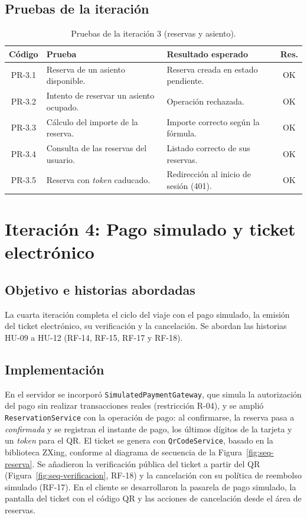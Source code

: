 \subsection{Pruebas de la iteración}

\begin{table}[h!]
\centering
\small
\begin{tabular}{|c|p{6.5cm}|p{5cm}|c|}
\hline
\textbf{Código} & \textbf{Prueba} & \textbf{Resultado esperado} & \textbf{Res.} \\ \hline
PR-3.1 & Reserva de un asiento disponible. & Reserva creada en estado pendiente. & OK \\ \hline
PR-3.2 & Intento de reservar un asiento ocupado. & Operación rechazada. & OK \\ \hline
PR-3.3 & Cálculo del importe de la reserva. & Importe correcto según la fórmula. & OK \\ \hline
PR-3.4 & Consulta de las reservas del usuario. & Listado correcto de sus reservas. & OK \\ \hline
PR-3.5 & Reserva con \textit{token} caducado. & Redirección al inicio de sesión (401). & OK \\ \hline
\end{tabular}
\caption{Pruebas de la iteración 3 (reservas y asiento).}
\label{tab:pruebas-it3}
\end{table}


\section{Iteración 4: Pago simulado y ticket electrónico}
\label{sec:iteracion-4}

\subsection{Objetivo e historias abordadas}

La cuarta iteración completa el ciclo del viaje con el pago simulado, la emisión del ticket electrónico, su verificación y la cancelación. Se abordan las historias HU-09 a HU-12 (RF-14, RF-15, RF-17 y RF-18).

\subsection{Implementación}

En el servidor se incorporó \texttt{SimulatedPaymentGateway}, que simula la autorización del pago sin realizar transacciones reales (restricción R-04), y se amplió \texttt{ReservationService} con la operación de pago: al confirmarse, la reserva pasa a \textit{confirmada} y se registran el instante de pago, los últimos dígitos de la tarjeta y un \textit{token} para el QR. El ticket se genera con \texttt{QrCodeService}, basado en la biblioteca ZXing, conforme al diagrama de secuencia de la Figura~\ref{fig:seq-reserva}. Se añadieron la verificación pública del ticket a partir del QR (Figura~\ref{fig:seq-verificacion}, RF-18) y la cancelación con su política de reembolso simulado (RF-17). En el cliente se desarrollaron la pasarela de pago simulado, la pantalla del ticket con el código QR y las acciones de cancelación desde el área de reservas.

